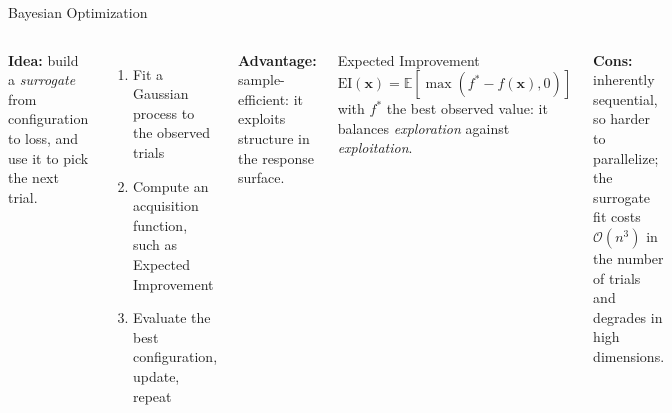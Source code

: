 \documentclass[aspectratio=169,11pt]{beamer}
\newcommand{\emphc}[1]{\textcolor{harvardcrimson}{#1}}
\newcommand{\x}{\bm{x}}
\newcommand{\E}[1]{\mathbb{E}\!\left[#1\right]}
\newcommand{\state}{\bm{x}}          %
\begin{document}
\begin{frame}{Bayesian Optimization}
\begin{columns}[T]
\textbf{Idea:} build a \emph{surrogate} from configuration to loss, and use it to pick the next trial.

\vspace{0.2cm}
\begin{enumerate}\itemsep2pt
    \item Fit a Gaussian process to the observed trials
    \item Compute an \emphc{acquisition function}, such as Expected Improvement
    \item Evaluate the best configuration, update, repeat
\end{enumerate}

\vspace{0.25cm}
{\footnotesize \textbf{Advantage:} \emphc{sample-efficient}: it exploits structure in the response surface.}

\begin{block}{Expected Improvement}
\footnotesize
\[
    \text{EI}(\state) = \E{\max(f^* - f(\state), 0)}
\]
with $f^*$ the best observed value: it balances \emph{exploration} against \emph{exploitation}.
\end{block}

\vspace{0.3cm}
{\footnotesize \textbf{Cons:} inherently sequential, so harder to parallelize; the surrogate fit costs $\mathcal{O}(n^3)$ in the number of trials and degrades in high dimensions.}
\end{columns}
\end{frame}
\end{document}
